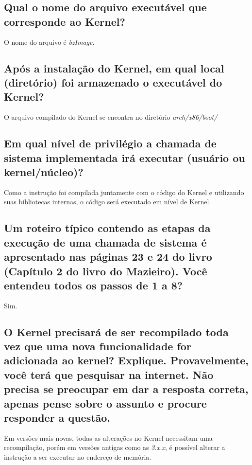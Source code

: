 \documentclass[12pt, a4paper]{article}
\begin{document}
	\subsection{Qual o nome do arquivo executável que corresponde ao Kernel?}
	
	\par O nome do arquivo é \textit{bzImage}.

	\subsection{Após a instalação do Kernel, em qual local (diretório) foi armazenado o executável do Kernel?}
	
	\par O arquivo compilado do Kernel se encontra no diretório \textit{arch/x86/boot/}

	\subsection{Em qual nível de privilégio a chamada de sistema implementada irá executar (usuário ou kernel/núcleo)?}
	
	\par Como a instrução foi compilada juntamente com o código do Kernel e utilizando suas bibliotecas internas, o código será executado em nível de Kernel.

	\subsection{Um roteiro típico contendo as etapas da execução de uma chamada de sistema é apresentado nas páginas 23 e 24 do livro (Capítulo 2 do livro do Mazieiro). Você entendeu todos os passos de 1 a 8?}
	
	\par Sim.

	\subsection{O Kernel precisará de ser recompilado toda vez que uma nova funcionalidade for adicionada ao kernel? Explique. Provavelmente, você terá que pesquisar na internet. Não precisa se preocupar em dar a resposta correta, apenas pense sobre o assunto e procure responder a questão.}
	
	\par Em versões mais novas, todas as alterações no Kernel necessitam uma recompilação, porém em versões antigas como as \textit{3.x.x}, é possível alterar a instrução a ser executar no endereço de memória.
	
\end{document}
